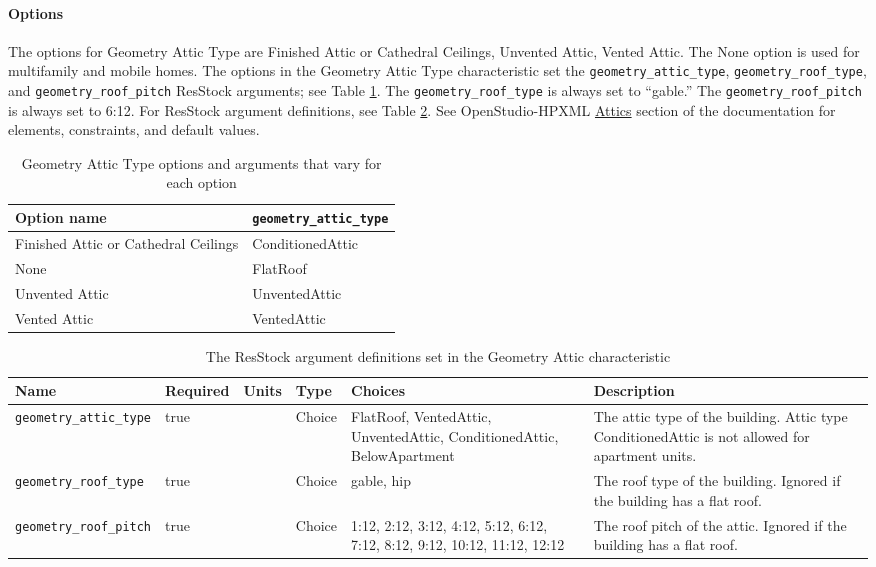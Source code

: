 \paragraph{Options}
The options for Geometry Attic Type are Finished Attic or Cathedral Ceilings, Unvented Attic, Vented Attic. The None option is used for multifamily and mobile homes. The options in the Geometry Attic Type characteristic set the \texttt{geometry\_attic\_type}, \texttt{geometry\_roof\_type}, and \texttt{geometry\_roof\_pitch} ResStock arguments; see Table \ref{table:hc_opt_attic}. The \texttt{geometry\_roof\_type} is always set to ``gable.'' The \texttt{geometry\_roof\_pitch} is always set to 6:12. For ResStock argument definitions, see Table \ref{table:hc_arg_def_attic}. See OpenStudio-HPXML \href{https://openstudio-hpxml.readthedocs.io/en/v1.8.1/workflow_inputs.html#hpxml-attics}{Attics} section of the documentation for elements, constraints, and default values.

\begin{longtable}[]{ |p{}|p{6cm}| }
\caption{Geometry Attic Type options and arguments that vary for each option} \label{table:hc_opt_attic} \\
\toprule\noalign{}
Option name & \texttt{geometry\_attic\_type} \\
\midrule\noalign{}
\endhead
\bottomrule\noalign{}
\endlastfoot
Finished Attic or Cathedral Ceilings & ConditionedAttic \\
\hline
None & FlatRoof \\
\hline
Unvented Attic & UnventedAttic \\
\hline
Vented Attic & VentedAttic \\
\end{longtable}

\begin{longtable}[]{ |p{}|p{1.5cm}|p{1cm}|p{1.1cm}|p{3.4cm}|p{4cm}| }
\caption{The ResStock argument definitions set in the Geometry Attic characteristic} \label{table:hc_arg_def_attic} \\
\toprule\noalign{}
Name & Required & Units & Type & Choices & Description \\
\midrule\noalign{}
\endhead
\bottomrule\noalign{}
\endlastfoot
\texttt{geometry\_attic\_type} & true & & Choice & FlatRoof,
VentedAttic, UnventedAttic, ConditionedAttic, BelowApartment & The attic
type of the building. Attic type ConditionedAttic is not allowed for
apartment units. \\
\hline
\texttt{geometry\_roof\_type} & true & & Choice & gable, hip & The roof
type of the building. Ignored if the building has a flat roof. \\
\hline
\texttt{geometry\_roof\_pitch} & true & & Choice & 1:12, 2:12, 3:12,
4:12, 5:12, 6:12, 7:12, 8:12, 9:12, 10:12, 11:12, 12:12 & The roof pitch
of the attic. Ignored if the building has a flat roof. \\
\end{longtable}

